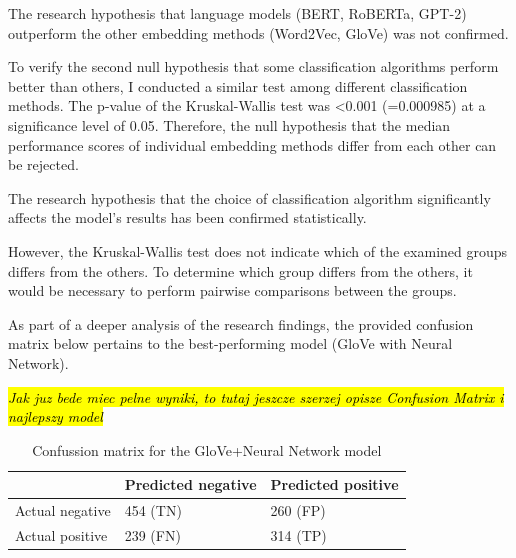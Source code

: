 The research hypothesis that language models (BERT, RoBERTa, GPT-2) outperform the other embedding methods (Word2Vec, GloVe) was not confirmed.

To verify the second null hypothesis that some classification algorithms perform better than others, I conducted a similar test among different classification methods.
The p-value of the Kruskal-Wallis test was <0.001 (=0.000985) at a significance level of 0.05. Therefore, the null hypothesis that the median performance scores of individual embedding methods differ from each other can be rejected.

The research hypothesis that the choice of classification algorithm significantly affects the model's results has been confirmed statistically.

However, the Kruskal-Wallis test does not indicate which of the examined groups differs from the others. To determine which group differs from the others, it would be necessary to perform pairwise comparisons between the groups.

As part of a deeper analysis of the research findings, the provided confusion matrix below pertains to the best-performing model (GloVe with Neural Network).

\hl{\textit{Jak juz bede miec pelne wyniki, to tutaj jeszcze szerzej opisze Confusion Matrix i najlepszy model}}



\begin{table}[htb]
\centering
{
\makegapedcells
\begin{tabular}{lll}
                & Predicted negative & Predicted positive \\
\hline
Actual negative & 454 (TN)           & 260 (FP) \\
Actual positive & 239 (FN)           & 314 (TP) \\
\hline
\end{tabular}
}
\caption{Confussion matrix for the GloVe+Neural Network model}
\label{glovenn_cm}
\end{table}